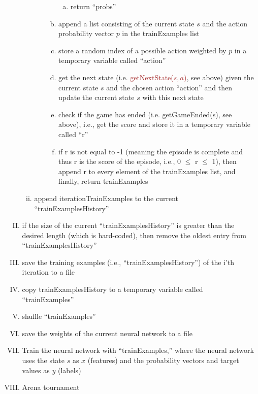 \documentclass[12pt]{article}
\begin{document}
\begin{redenum}
\begin{enumerate}[A.)]
\begin{enumerate}[I.)]
\begin{enumerate}[i.)]
\begin{enumerate}[a.)]
\begin{goldenum}
\begin{enumerate}[a.)]
\begin{redenumnest}
\begin{enumerate}[a.)]
								\item return ``probs''
							\end{enumerate}
							\end{redenumnest}
							\item append a list consisting of the current state $s$ and the action probability vector $p$ in the trainExamples list
							\item store a random index of a possible action weighted by $p$ in a temporary variable called ``action''
							\item get the next state (i.e.  \textcolor{brown}{getNextState($s,a$)}, see above) given the current state $s$ and the chosen action ``action'' and then update the current state $s$ with this next state
							\item check if the game has ended (i.e.  \textcolor{grassgreen}{getGameEnded(s)}, see above), i.e., get the score and store it in a temporary variable called ``r''
							\item if r is not equal to -1 (meaning the episode is complete and thus r is the score of the episode, i.e., 0 $\leq$ r $\leq$ 1), then append r to every element of the trainExamples list, and finally, return trainExamples
						\end{enumerate}
					\end{goldenum}
				\end{enumerate}
				\item append iterationTrainExamples to the current ``trainExamplesHistory''
			\end{enumerate}
			\item if the size of the current ``trainExamplesHistory'' is greater than the desired length (which is hard-coded), then remove the oldest entry from ``trainExamplesHistory''
			\item save the training examples (i.e., ``trainExamplesHistory'') of the i'th iteration to a file
			\item copy trainExamplesHistory to a temporary variable called ``trainExamples''
			\item shuffle ``trainExamples''
			\item save the weights of the current neural network to a file
			\item Train the neural network with ``trainExamples,'' where the neural network uses the state $s$ as $x$ (features) and the probability vectors and target values as $y$ (labels)
			\item Arena tournament
			\begin{enumerate}[i.)]

\end{enumerate}
\end{enumerate}
\end{enumerate}
\end{redenum}
\end{document}
